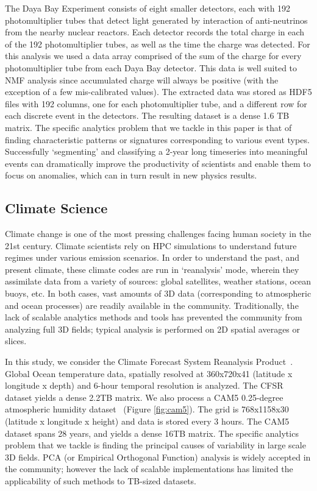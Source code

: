 The Daya Bay Experiment consists of eight smaller detectors, each with 192 photomultiplier tubes that detect light generated by interaction of anti-neutrinos from the nearby nuclear reactors. Each detector records the total charge in each of the 192 photomultiplier tubes, as well as the time the charge was detected. For this analysis we used a data array comprised of the sum of the charge for every photomultiplier tube from each Daya Bay detector. This data is well suited to NMF analysis since accumulated charge will always be positive (with the exception of a few mis-calibrated values). The extracted data was stored as HDF5 files with 192 columns, one for each photomultiplier tube, and a different row for each discrete event in the detectors. The resulting dataset is a dense 1.6 TB matrix. The specific analytics problem that we tackle in this paper is that of finding characteristic patterns or signatures corresponding to various event types. Successfully `segmenting' and classifying a 2-year long timeseries into meaningful events can dramatically improve the productivity of scientists and enable them to focus on anomalies, which can in turn result in new physics results.

\subsection{Climate Science}

Climate change is one of the most pressing challenges facing human society in the 21st century. Climate scientists rely on HPC simulations to understand future regimes under various emission scenarios. In order to understand the past, and present climate, these climate codes are run in `reanalysis' mode, wherein they assimilate data from a variety of sources: global satellites, weather stations, ocean buoys, etc. In both cases, vast amounts of 3D data (corresponding to atmospheric and ocean processes) are readily available in the community. Traditionally, the lack of scalable analytics methods and tools has prevented the community from analyzing full 3D fields; typical analysis is performed on 2D spatial averages or slices. 

In this study, we consider the Climate Forecast System Reanalysis Product~\cite{saha:2010}. Global Ocean temperature data, spatially resolved at 360x720x41 (latitude x longitude x depth) and 6-hour temporal resolution is analyzed. The CFSR dataset yields a dense 2.2TB matrix. We also process a CAM5 0.25-degree atmospheric humidity dataset~\cite{wehner:2014} (Figure  \ref{fig:cam5}). The grid is 768x1158x30 (latitude x longitude x height) and data is stored every 3 hours. The CAM5 dataset spans 28 years, and yields a dense 16TB matrix. The specific analytics problem that we tackle is finding the principal causes of variability in large scale 3D fields. PCA (or Empirical Orthogonal Function) analysis is widely accepted in the community; however the lack of scalable implementations has limited the applicability of such methods to TB-sized datasets.  

